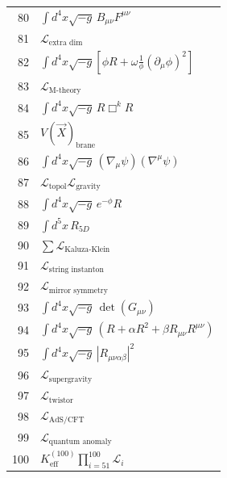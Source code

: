 \documentclass[11pt,a4paper]{article}
\begin{document}
\begin{longtable}{r p{}}
	80 & \(\displaystyle \int d^4x\sqrt{-g}\,B_{\mu\nu}F^{\mu\nu}\) \\
	81 & \(\displaystyle \mathcal{L}_{\text{extra dim}}\) \\
	82 & \(\displaystyle \int d^4x\sqrt{-g}\left[\phi R + \omega\frac{1}{\phi}(\partial_\mu\phi)^2\right]\) \\
	83 & \(\displaystyle \mathcal{L}_{\text{M-theory}}\) \\
	84 & \(\displaystyle \int d^4x\sqrt{-g}\,R\Box^k R\) \\
	85 & \(\displaystyle V(\vec{X})_{\text{brane}}\) \\
	86 & \(\displaystyle \int d^4x\sqrt{-g}\,(\nabla_\mu\psi)(\nabla^\mu\psi)\) \\
	87 & \(\displaystyle \mathcal{L}_{\text{topol}}\mathcal{L}_{\text{gravity}}\) \\
	88 & \(\displaystyle \int d^4x\sqrt{-g}\,e^{-\phi}R\) \\
	89 & \(\displaystyle \int d^5x\,R_{5D}\) \\
	90 & \(\displaystyle \sum\mathcal{L}_{\text{Kaluza-Klein}}\) \\
	91 & \(\displaystyle \mathcal{L}_{\text{string instanton}}\) \\
	92 & \(\displaystyle \mathcal{L}_{\text{mirror symmetry}}\) \\
	93 & \(\displaystyle \int d^4x\sqrt{-g}\,\det(G_{\mu\nu})\) \\
	94 & \(\displaystyle \int d^4x\sqrt{-g}\,\left(R + \alpha R^2 + \beta R_{\mu\nu}R^{\mu\nu}\right)\) \\
	95 & \(\displaystyle \int d^4x\sqrt{-g}\,|R_{\mu\nu\alpha\beta}|^2\) \\
	96 & \(\displaystyle \mathcal{L}_{\text{supergravity}}\) \\
	97 & \(\displaystyle \mathcal{L}_{\text{twistor}}\) \\
	98 & \(\displaystyle \mathcal{L}_{\text{AdS/CFT}}\) \\
	99 & \(\displaystyle \mathcal{L}_{\text{quantum anomaly}}\) \\
	100 & \(\displaystyle K^{(100)}_{\mathrm{eff}}\prod_{i=51}^{100}\mathcal{L}_i\) \\
	

\end{longtable}
\end{document}
